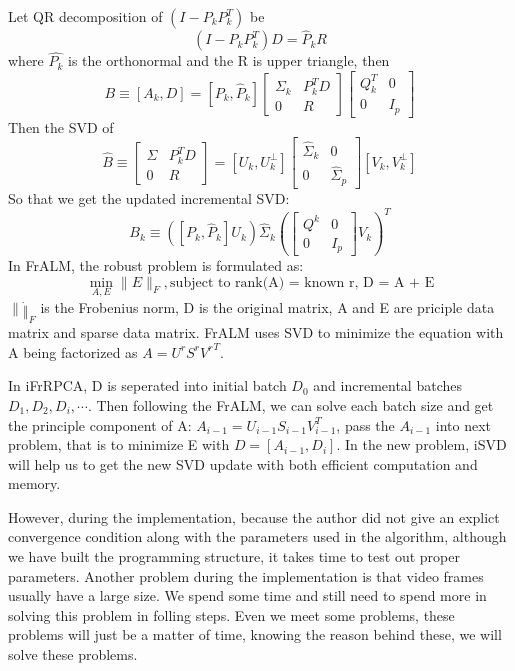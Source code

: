 \documentclass[oneside]{article}
\begin{document}
Let QR decomposition of $(I - P_k P_k^T)$ be
\[ (I- P_kP^T_k)D = \hat{P}_k R \]
where $\hat{P_k}$ is the orthonormal and the R is upper triangle, then
\[B \equiv [A_k, D] = [P_k, \hat{P}_k] \begin{bmatrix}\Sigma_k & P^T_k D \\ 0 & R\end{bmatrix} 
                        \begin{bmatrix}Q_k^T & 0 \\ 0 & I_p \end{bmatrix}\]
Then the SVD of
\[ \hat{B} \equiv \begin{bmatrix} \Sigma & P^T_k D \\ 0 & R \end{bmatrix} = [U_k, U_k^{\perp}] 
                  \begin{bmatrix} \hat{\Sigma}_k & 0 \\ 0 & \hat{\Sigma}_p \end{bmatrix} [V_k, V_k^{\perp}] \]
So that we get the updated incremental SVD:
\[B_k \equiv ([P_k, \hat{P}_k] U_k) \hat{\Sigma}_k 
                                (\begin{bmatrix} Q^k & 0 \\ 0 & I_p \end{bmatrix} V_k)^T\]
In FrALM, the robust problem is formulated as:
\[\min\limits_{A,E}{\|E\|_F}, \text{subject to rank(A) = known r, D = A + E}\]
$\|\dot\|_F$ is the Frobenius norm, D is the original matrix, A and E are priciple data matrix and sparse data matrix. FrALM uses SVD to minimize the equation with A being factorized as $A = U^r S^r {V^r}^T$.

In iFrRPCA, D is seperated into initial batch $D_0$  and incremental batches $D_1, D_2, D_i, \cdots$. Then following the FrALM, we can solve each batch size and get the principle component of A: $A_{i- 1} = U_{i-1} S_{i-1} V^T_{i-1}$, pass the $A_{i-1}$ into next problem, that is to minimize E with $D = [A_{i -1}, D_i]$. In the new problem, iSVD will help us to get the new SVD update with both efficient computation and memory.

However, during the implementation, because the author did not give an explict convergence condition along with the parameters used in the algorithm, although we have built the programming structure, it takes time to test out proper parameters. Another problem during the implementation is that video frames usually have a large size. We spend some time and still need to spend more in solving this problem in folling steps. Even we meet some problems, these problems will just be a matter of time, knowing the reason behind these, we will solve these problems.
\end{document}
